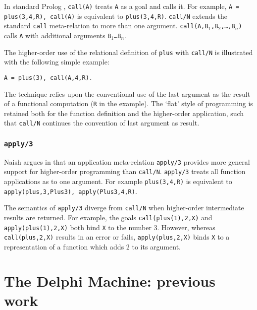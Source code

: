 In standard Prolog \cite{DEDC96}, \texttt{call(A)} treats \texttt{A} as a
goal and calls it.  For example, \texttt{A = plus(3,4,R), call(A)} is equivalent
to \texttt{plus(3,4,R)}.  \texttt{call/N} \cite{Nai96}
extends the standard \texttt{call} meta-relation to more than one argument.
\texttt{call(A,B$_1$,B$_2$,\ldots,B$_n$)} calls \texttt{A} with additional
arguments \texttt{B$_1$\ldots B$_n$}.

The higher-order use of the relational definition of \texttt{plus} with \texttt{call/N}
is illustrated with the following simple example:
\begin{verbatim}
A = plus(3), call(A,4,R).
\end{verbatim}
The technique relies upon the conventional use of the last argument as the result of 
a functional computation (\texttt{R} in the example).  The `flat' style of 
programming is retained both for the function definition and the higher-order
application, such that \texttt{call/N} continues the convention of last argument as
result.

\subsubsection{\texttt{apply/3}}

Naish argues in \cite{Nai96} that an application meta-relation \texttt{apply/3} provides
more general support for higher-order programming than \texttt{call/N}.  \texttt{apply/3}
treats all function applications as to one argument.  For example \texttt{plus(3,4,R)} is
equivalent to \texttt{apply(plus,3,Plus3), apply(Plus3,4,R)}.

The semantics of \texttt{apply/3} diverge from \texttt{call/N} when
higher-order intermediate results are returned.  For example, the goals
\texttt{call(plus(1),2,X)} and \texttt{apply(plus(1),2,X)} both bind \texttt{X} to
the number 3.  However, whereas \texttt{call(plus,2,X)} results in an error or
fails, \texttt{apply(plus,2,X)} binds \texttt{X} to a representation of a function
which adds 2 to its argument.

\section{The Delphi Machine: previous work} %
\label{delphi_machine_pwork}

